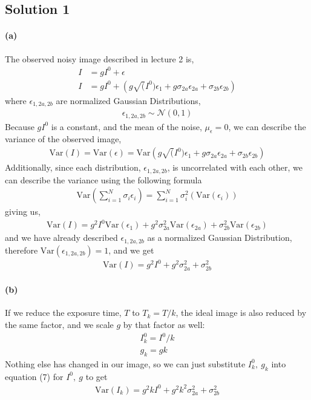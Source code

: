 \documentclass{article}
\newcommand{\solution}[1]{\clearpage \subsection*{Solution #1}}
\newcommand{\spart}[1]{\paragraph{(#1)}}
\begin{document}

\solution{1} 

\spart{a} The observed noisy image described in lecture 2 is, 
\begin{align}
	I & = gI^0 + \epsilon \\
	I & = gI^0 + \left(g\sqrt(I^0)\epsilon_1 + g\sigma_{2a}\epsilon_{2a} + \sigma_{2b}\epsilon_{2b}\right)
\end{align}
where $\epsilon_{1,2a,2b}$ are normalized Gaussian Distributions, 
\begin{align}
	\epsilon_{1,2a,2b} \sim \mathcal{N} (0,1)
\end{align}
Because $gI^0$ is a constant, and the mean of the noise, $\mu_\epsilon = 0$, we can describe the variance of the observed image,
\begin{align}
	\text{Var}(I) = \text{Var}(\epsilon) = \text{Var}\left(g\sqrt(I^0)\epsilon_1 + g\sigma_{2a}\epsilon_{2a} + \sigma_{2b}\epsilon_{2b}\right)
\end{align}
Additionally, since each distribution, $\epsilon_{1,2a,2b}$, is uncorrelated with each other, we can describe the variance using the following formula
\begin{align}
	\text{Var}\left(\sum_{i=1}^{N} \sigma_i \epsilon_i \right) = \sum_{i=1}^{N} \sigma_i^2 \left(\text{Var}(\epsilon_i)\right)
\end{align}
giving us,
\begin{align}
	\text{Var}(I) = g^2I^0\text{Var}(\epsilon_1) + g^2\sigma_{2a}^2\text{Var}(\epsilon_{2a}) + \sigma_{2b}^2\text{Var}(\epsilon_{2b})
\end{align}
and we have already described $\epsilon_{1,2a,2b}$ as a normalized Gaussian Distribution, therefore $\text{Var}(\epsilon_{1,2a,2b}) = 1$, and we get
\begin{align}
	\boxed{\text{Var}(I) = g^2I^0 + g^2\sigma_{2a}^2+\sigma_{2b}^2}
\end{align}

\spart{b} If we reduce the exposure time, $T$ to $T_k = T/k$, the ideal image is also reduced by the same factor, and we scale $g$ by that factor as well:
\begin{align}
	I^0_k = I^0/k \\
	g_k = g k
\end{align}
Nothing else has changed in our image, so we can just substitute $I^0_k,\ g_k$ into equation (7) for $I^0,\ g$ to get
\begin{align}
	\boxed{\text{Var}(I_k) = g^2 k I^0 + g^2 k^2 \sigma_{2a}^2+\sigma_{2b}^2}
\end{align}
 
\end{document}
